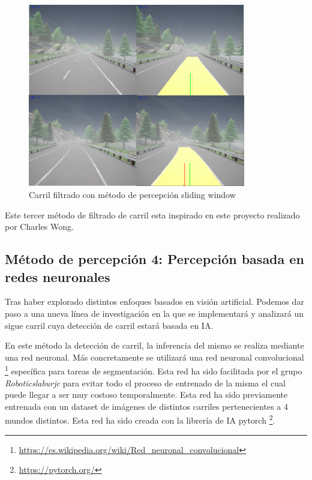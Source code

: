 \begin{figure} [H]
	\begin{center}
	\includegraphics[height=8cm]{imagenes/cap4/graphics_sliding_window/carril_filtrado.pdf}
	\end{center}
	\caption[Carril filtrado con método de percepción sliding window]{Carril filtrado con método de percepción sliding window}
	\label{fig:Carril filtrado con método sliding window}
\end{figure}



Este tercer método de filtrado de carril esta inspirado en este proyecto \cite{sliding_window_lane_detection} realizado por Charles Wong.

\subsection{Método de percepción 4: Percepción basada en redes neuronales}
\label{Método 1: Redes neuronales}

Tras haber explorado distintos enfoques basados en visión artificial. Podemos dar paso a una nueva línea de investigación en la que se implementará y analizará un sigue carril cuya detección de carril estará basada en \ac{IA}.

\bigskip

En este método la detección de carril, la inferencia del mismo se realiza mediante una red neuronal. Más concretamente se utilizará una red neuronal convolucional \footnote{\url{https://es.wikipedia.org/wiki/Red_neuronal_convolucional}} específica para tareas de segmentación. Esta red ha sido facilitada por el grupo \textit{Roboticslaburjc} para evitar todo el proceso de entrenado de la misma el cual puede llegar a ser muy costoso temporalmente. Esta red ha sido previamente entrenada con un dataset de imágenes de distintos carriles pertenecientes a 4 mundos distintos. Esta red ha sido creada con la librería de \ac{IA} pytorch \footnote{\url{https://pytorch.org/}}. 

